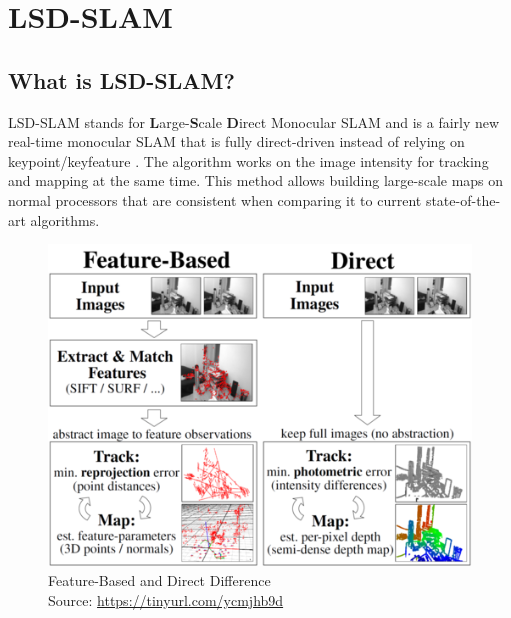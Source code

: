 
\chapter{LSD-SLAM\authorA}\label{ref:lsdslam}

\section{What is LSD-SLAM?}
LSD-SLAM stands for \textbf{L}arge-\textbf{S}cale \textbf{D}irect Monocular SLAM and is a fairly new real-time monocular SLAM that is fully direct-driven instead of relying on keypoint/keyfeature \cite{lsdslam_eccv}. The algorithm works on the image intensity for tracking and mapping at the same time.\newline
This method allows building large-scale maps on normal processors that are consistent when comparing it to current state-of-the-art algorithms. \newline

\begin{figure}[h]
	\centering
	\includegraphics[height=0.5\textwidth]{./media/images/direct-vs-feature-based.png}
  	\caption{Feature-Based and Direct Difference
  	\\Source: \url{https://tinyurl.com/ycmjhb9d}}
  	\label{featurebased_direct_difference}
\end{figure}

